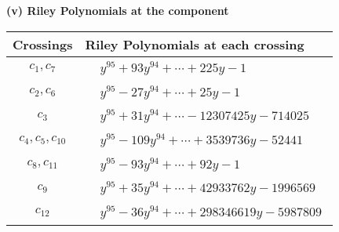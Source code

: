 \documentclass[1p]{elsarticle_modified}
\theoremstyle{definition}
\begin{document}
\flushleft \textbf{(v) Riley Polynomials at the component}\newline \\
\begin{tabular}{m{50pt}|m{274pt}}
Crossings & \hspace{64pt}Riley Polynomials at each crossing \\
\hline $$\begin{aligned}c_{1},c_{7}\end{aligned}$$&$\begin{aligned}
&y^{95}+93 y^{94}+\cdots+225 y-1
\end{aligned}$\\
\hline $$\begin{aligned}c_{2},c_{6}\end{aligned}$$&$\begin{aligned}
&y^{95}-27 y^{94}+\cdots+25 y-1
\end{aligned}$\\
\hline $$\begin{aligned}c_{3}\end{aligned}$$&$\begin{aligned}
&y^{95}+31 y^{94}+\cdots-12307425 y-714025
\end{aligned}$\\
\hline $$\begin{aligned}c_{4},c_{5},c_{10}\end{aligned}$$&$\begin{aligned}
&y^{95}-109 y^{94}+\cdots+3539736 y-52441
\end{aligned}$\\
\hline $$\begin{aligned}c_{8},c_{11}\end{aligned}$$&$\begin{aligned}
&y^{95}-93 y^{94}+\cdots+92 y-1
\end{aligned}$\\
\hline $$\begin{aligned}c_{9}\end{aligned}$$&$\begin{aligned}
&y^{95}+35 y^{94}+\cdots+42933762 y-1996569
\end{aligned}$\\
\hline $$\begin{aligned}c_{12}\end{aligned}$$&$\begin{aligned}
&y^{95}-36 y^{94}+\cdots+298346619 y-5987809
\end{aligned}$\\
\hline
\end{tabular}\\~\\
\end{document}
